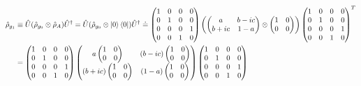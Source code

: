\documentclass[11pt]{article}
\numberwithin{equation}{section} %
\numberwithin{figure}{section} %
\begin{document}
\begin{appendices}
\vspace{1cm}
\subsection{}  \label{rho_0_and_U_CNOT}

\begin{equation} \label{rho_0_Appendix}
\begin{split}
\hat{\rho}_{g_1}
&\equiv\hat{U}(\hat{\rho}_{g_0}\otimes\hat{\rho}_A)\hat{U}^\dagger=\hat{U}(\hat{\rho}_{g_0}\otimes\ket{0}\bra{0})\hat{U}^\dagger\doteq\begin{pmatrix}1&0&0&0\\0&1&0&0\\0&0&0&1\\0&0&1&0\end{pmatrix}\left(\begin{pmatrix}a&b-ic\\b+ic&1-a\end{pmatrix}\otimes\begin{pmatrix}1&0\\0&0\end{pmatrix}\right)\begin{pmatrix}1&0&0&0\\0&1&0&0\\0&0&0&1\\0&0&1&0\end{pmatrix}^T\\
&=\begin{pmatrix}1&0&0&0\\0&1&0&0\\0&0&0&1\\0&0&1&0\end{pmatrix}\begin{pmatrix}a\begin{pmatrix}1&0\\0&0\end{pmatrix}&(b-ic)\begin{pmatrix}1&0\\0&0\end{pmatrix}\\(b+ic)\begin{pmatrix}1&0\\0&0\end{pmatrix}&(1-a)\begin{pmatrix}1&0\\0&0\end{pmatrix}\end{pmatrix}\begin{pmatrix}1&0&0&0\\0&1&0&0\\0&0&0&1\\0&0&1&0\end{pmatrix}\\

\end{split}
\end{equation}
\end{appendices}
\end{document}
